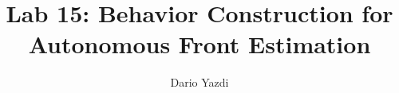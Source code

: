 \documentclass[12pt]{article}
\begin{document}
\title{Lab 15: Behavior Construction for Autonomous Front Estimation}
\author{Dario Yazdi}
\maketitle
\end{document}
